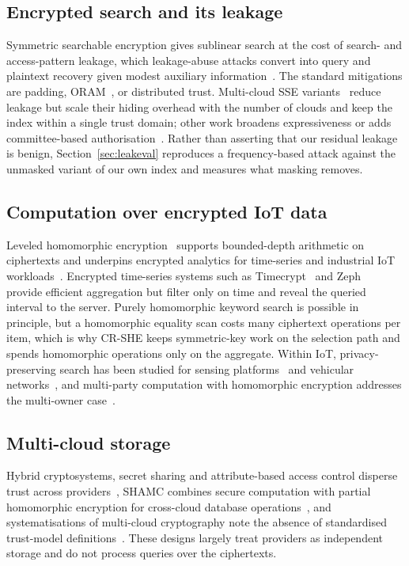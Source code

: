 \documentclass[journal]{IEEEtran}
\begin{document}
\subsection{Encrypted search and its leakage}
Symmetric searchable encryption gives sublinear search at the cost of search- and access-pattern leakage, which leakage-abuse attacks convert into query and plaintext recovery given modest auxiliary information~\cite{islam2012access,cash2015leakage,grubbs2017leakage}. The standard mitigations are padding, ORAM~\cite{goldreich1996software}, or distributed trust. Multi-cloud SSE variants~\cite{xu2021privacy,xu2023symmetric} reduce leakage but scale their hiding overhead with the number of clouds and keep the index within a single trust domain; other work broadens expressiveness or adds committee-based authorisation~\cite{zhang2024secure,yang2023dynamic,du2022lightweight}. Rather than asserting that our residual leakage is benign, Section~\ref{sec:leakeval} reproduces a frequency-based attack against the unmasked variant of our own index and measures what masking removes.

\subsection{Computation over encrypted IoT data}
Leveled homomorphic encryption~\cite{fan2012somewhat,cryptoeprint:2016/421} supports bounded-depth arithmetic on ciphertexts and underpins encrypted analytics for time-series and industrial IoT workloads~\cite{halder2022enabling,kamble2024homomorphic}. Encrypted time-series systems such as Timecrypt~\cite{timecrypt} and Zeph~\cite{zeph} provide efficient aggregation but filter only on time and reveal the queried interval to the server. Purely homomorphic keyword search is possible in principle, but a homomorphic equality scan costs many ciphertext operations per item, which is why CR-SHE keeps symmetric-key work on the selection path and spends homomorphic operations only on the aggregate. Within IoT, privacy-preserving search has been studied for sensing platforms~\cite{xu2019achieving} and vehicular networks~\cite{wu2024distributed}, and multi-party computation with homomorphic encryption addresses the multi-owner case~\cite{verma2025secure}.

\subsection{Multi-cloud storage}
Hybrid cryptosystems, secret sharing and attribute-based access control disperse trust across providers~\cite{bharot2025cloudlock,muthuvel2026design}, SHAMC combines secure computation with partial homomorphic encryption for cross-cloud database operations~\cite{wang2020shamc}, and systematisations of multi-cloud cryptography note the absence of standardised trust-model definitions~\cite{cryptoeprint:2026/207}. These designs largely treat providers as independent storage and do not process queries over the ciphertexts.
\end{document}

